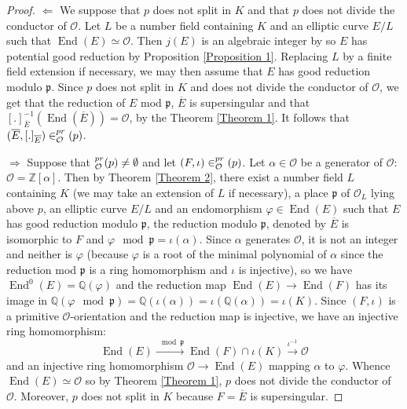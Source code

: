 \documentclass[a4paper,10pt]{report}
\theoremstyle{definition}
\theoremstyle{plain}
\theoremstyle{definition}
\newcommand{\Z}{\mathbb{Z}}
\newcommand{\Q}{\mathbb{Q}}
\newcommand{\mO}{\mathcal{O}}
\renewcommand{\(}{\left(}
\renewcommand{\)}{\right)}
\newcommand{\mfp}{\mathfrak{p}}
\DeclareMathOperator{\End}{End}
\let\SS\relax
\DeclareMathOperator{\SS}{SS}
\begin{document}
\begin{proof}
$\Longleftarrow$ We suppose that $p$ does not split in $K$ and that $p$ does not divide the conductor of $\mO$.  Let $L$ be a number field containing $K$ and an elliptic curve $E/L$ such that $\End(E)\simeq \mO$. Then $j(E)$ is an algebraic integer by \cite[Theorem II.6.1]{Silverman2} so $E$ has potential good reduction by Proposition \ref{Proposition 1}. Replacing $L$ by a finite field extension if necessary, we may then assume that $E$ has good reduction modulo $\mfp$.  Since $p$ does not split in $K$ and does not divide the conductor of $\mO$, we get that the reduction of $E$ mod $\mfp$, $\overline{E}$ is supersingular and that $[.]_{\overline{E}}^{-1}(\End(\overline{E}))=\mO$, by the Theorem \ref{Theorem 1}. It follows that $(\overline{E}, [.]_{\overline{E}})\in\SS_{\mO}^{pr}(p)$.

$\Longrightarrow$ Suppose that $\SS_{\mO}^{pr}(p)\neq\emptyset$ and let $(F,\iota)\in\SS_{\mO}^{pr}(p)$. Let $\alpha\in \mO$ be a generator of $\mO$: $\mO=\Z[\alpha]$. Then by Theorem \ref{Theorem 2}, there exist a number field $L$ containing $K$ (we may take an extension of $L$ if necessary), a place $\mfp$ of $\mO_L$ lying above $p$, an elliptic curve $E/L$ and an endomorphism $\varphi\in\End(E)$ such that $E$ has good reduction modulo $\mfp$, the reduction modulo $\mfp$,  denoted by $\overline{E}$ is isomorphic to $F$ and $\varphi \mod \mfp= \iota(\alpha)$.  Since $\alpha$ generates $\mO$, it is not an integer and neither is $\varphi$ (because $\varphi$ is a root of the minimal polynomial of $\alpha$ since the reduction mod $\mfp$ is a ring homomorphism and $\iota$ is injective), so we have $\End^0(E)=\Q(\varphi)$ and the reduction map $\End(E)\longrightarrow\End(F)$ has its image in $\Q(\varphi \mod \mfp)=\Q(\iota(\alpha))=\iota(\Q(\alpha))=\iota(K)$.  Since $(F,\iota)$ is a primitive $\mO$-orientation and the reduction map is injective, we have an injective ring homomorphism:
\[\End(E)\overset{\mod \mfp}{\longrightarrow}\End(F)\cap\iota(K)\overset{\iota^{-1}}{\longrightarrow}\mO\]
and an injective ring homomorphism $\mO\longrightarrow\End(E)$ mapping $\alpha$ to $\varphi$. Whence $\End(E)\simeq \mO$ so by Theorem \ref{Theorem 1}, $p$ does not divide the conductor of $\mO$.  Moreover, $p$ does not split in $K$ because $F=\overline{E}$ is supersingular.
\end{proof}
\end{document}
